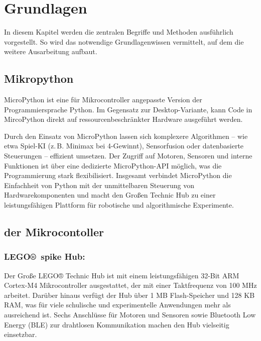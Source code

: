 \chapter{Grundlagen}
In diesem Kapitel werden die zentralen Begriffe und Methoden ausführlich vorgestellt. So wird das notwendige Grundlagenwissen vermittelt, auf dem die weitere Ausarbeitung aufbaut.

\section{Mikropython}
MicroPython ist eine für Mikrocontroller angepasste Version der Programmiersprache Python. Im Gegensatz zur Desktop-Variante, kann Code in MircoPython direkt auf ressourcenbeschränkter Hardware ausgeführt werden.\autocite{energy_responsiveness2023} \autocite{Plauska2023}



Durch den Einsatz von MicroPython lassen sich komplexere Algorithmen – wie etwa Spiel-KI (z.\,B. Minimax bei 4-Gewinnt), Sensorfusion oder datenbasierte Steuerungen – effizient umsetzen. Der Zugriff auf Motoren, Sensoren und interne Funktionen ist über eine dedizierte MicroPython-API möglich, was die Programmierung stark flexibilisiert. Insgesamt verbindet MicroPython die Einfachheit von Python mit der unmittelbaren Steuerung von Hardwarekomponenten und macht den Großen Technic Hub zu einer leistungsfähigen Plattform für robotische und algorithmische Experimente.

\section{der Mikrocontoller}
\subsection*{LEGO® spike Hub:}
Der Große LEGO® Technic Hub ist mit einem leistungsfähigen 32-Bit ARM Cortex-M4 Mikrocontroller ausgestattet, der mit einer Taktfrequenz von 100 MHz arbeitet. Darüber hinaus verfügt der Hub über 1 MB Flash-Speicher und 128 KB RAM, was für viele schulische und experimentelle Anwendungen mehr als ausreichend ist. Sechs Anschlüsse für Motoren und Sensoren sowie Bluetooth Low Energy (BLE) zur drahtlosen Kommunikation machen den Hub vielseitig einsetzbar.

